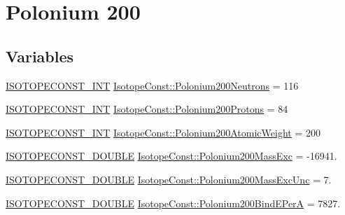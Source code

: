 \hypertarget{group___isotope_const-_polonium-_po200}{}\section{Polonium 200}
\label{group___isotope_const-_polonium-_po200}
\subsection*{Variables}
\begin{DoxyCompactItemize}
\item 
\mbox{\hyperlink{group___isotope_const-_macros_ga5f18360b3e99483a35c32d789e62621c}{I\+S\+O\+T\+O\+P\+E\+C\+O\+N\+S\+T\+\_\+\+I\+NT}} \mbox{\hyperlink{group___isotope_const-_polonium-_po200_ga1b3987867023e6047a4e7f3082d0c882}{Isotope\+Const\+::\+Polonium200\+Neutrons}} = 116
\item 
\mbox{\hyperlink{group___isotope_const-_macros_ga5f18360b3e99483a35c32d789e62621c}{I\+S\+O\+T\+O\+P\+E\+C\+O\+N\+S\+T\+\_\+\+I\+NT}} \mbox{\hyperlink{group___isotope_const-_polonium-_po200_ga4b39674a87e48f158c6a6fe8867342ea}{Isotope\+Const\+::\+Polonium200\+Protons}} = 84
\item 
\mbox{\hyperlink{group___isotope_const-_macros_ga5f18360b3e99483a35c32d789e62621c}{I\+S\+O\+T\+O\+P\+E\+C\+O\+N\+S\+T\+\_\+\+I\+NT}} \mbox{\hyperlink{group___isotope_const-_polonium-_po200_gaa5de176e4cfec4ef41879cecb3fe0255}{Isotope\+Const\+::\+Polonium200\+Atomic\+Weight}} = 200
\item 
\mbox{\hyperlink{group___isotope_const-_macros_ga8f45a7272ce02c0b4c65c44636ed719a}{I\+S\+O\+T\+O\+P\+E\+C\+O\+N\+S\+T\+\_\+\+D\+O\+U\+B\+LE}} \mbox{\hyperlink{group___isotope_const-_polonium-_po200_ga914e1bc64e487884d96bde908f3f27d9}{Isotope\+Const\+::\+Polonium200\+Mass\+Exc}} = -\/16941.
\item 
\mbox{\hyperlink{group___isotope_const-_macros_ga8f45a7272ce02c0b4c65c44636ed719a}{I\+S\+O\+T\+O\+P\+E\+C\+O\+N\+S\+T\+\_\+\+D\+O\+U\+B\+LE}} \mbox{\hyperlink{group___isotope_const-_polonium-_po200_ga6f6650470babd5dd2486de2b409b433d}{Isotope\+Const\+::\+Polonium200\+Mass\+Exc\+Unc}} = 7.
\item 
\mbox{\hyperlink{group___isotope_const-_macros_ga8f45a7272ce02c0b4c65c44636ed719a}{I\+S\+O\+T\+O\+P\+E\+C\+O\+N\+S\+T\+\_\+\+D\+O\+U\+B\+LE}} \mbox{\hyperlink{group___isotope_const-_polonium-_po200_gace1166e6b7c2ea7ec9b22aed57307247}{Isotope\+Const\+::\+Polonium200\+Bind\+E\+PerA}} = 7827.
\item 

\end{DoxyCompactItemize}

